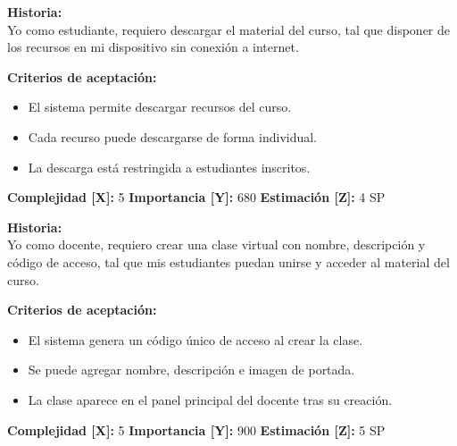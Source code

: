 \documentclass[12pt,a4paper]{article}
\begin{document}
\begin{tcolorbox}[title=\textbf{HU-10: Descargar material del curso}]
\textbf{Historia:} \\
Yo como estudiante, requiero descargar el material del curso, tal que disponer de los recursos en mi dispositivo sin conexión a internet.

\vspace{0.5em}
\textbf{Criterios de aceptación:}
\begin{itemize}
    \item El sistema permite descargar recursos del curso.
    \item Cada recurso puede descargarse de forma individual.
    \item La descarga está restringida a estudiantes inscritos.
\end{itemize}
\textbf{Complejidad [X]:} 5 \hfill \textbf{Importancia [Y]:} 680 \hfill \textbf{Estimación [Z]:} 4 SP
\end{tcolorbox}

\vspace{0.5em}

\begin{tcolorbox}[title=\textbf{HU-11: Crear una clase virtual}]
\textbf{Historia:} \\
Yo como docente, requiero crear una clase virtual con nombre, descripción y código de acceso, tal que mis estudiantes puedan unirse y acceder al material del curso.

\vspace{0.5em}
\textbf{Criterios de aceptación:}
\begin{itemize}
    \item El sistema genera un código único de acceso al crear la clase.
    \item Se puede agregar nombre, descripción e imagen de portada.
    \item La clase aparece en el panel principal del docente tras su creación.
\end{itemize}
\textbf{Complejidad [X]:} 5 \hfill \textbf{Importancia [Y]:} 900 \hfill \textbf{Estimación [Z]:} 5 SP
\end{tcolorbox}

\vspace{0.5em}
\end{document}
